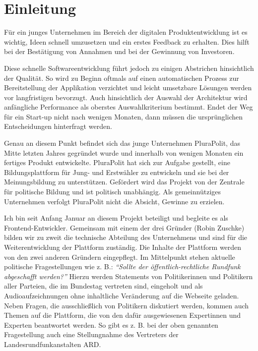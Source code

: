 \section{Einleitung}

Für ein junges Unternehmen im Bereich der digitalen Produktentwicklung ist es wichtig, Ideen schnell umzusetzen und ein erstes Feedback zu erhalten. Dies hilft bei der Bestätigung von Annahmen und bei der Gewinnung von Investoren.

Diese schnelle Softwareentwicklung führt jedoch zu einigen Abstrichen hinsichtlich der Qualität. So wird zu Beginn oftmals auf einen automatischen Prozess zur Bereitstellung der Applikation verzichtet und leicht umsetzbare Lösungen werden vor langfristigen bevorzugt. Auch hinsichtlich der Auswahl der Architektur wird anfängliche Performance als oberstes Auswahlkriterium bestimmt. Endet der Weg für ein Start-up nicht nach wenigen Monaten, dann müssen die ursprünglichen Entscheidungen hinterfragt werden.

Genau an diesem Punkt befindet sich das junge Unternehmen PluraPolit, das Mitte letzten Jahres gegründet wurde und innerhalb von wenigen Monaten ein fertiges Produkt entwickelte. PluraPolit hat sich zur Aufgabe gestellt, eine Bildungsplattform für Jung- und Erstwähler zu entwickeln und sie bei der Meinungsbildung zu unterstützen. Gefördert wird das Projekt von der Zentrale für politische Bildung und ist politisch unabhängig. Als gemeinnütziges Unternehmen verfolgt PluraPolit nicht die Absicht, Gewinne zu erzielen.

Ich bin seit Anfang Januar an diesem Projekt beteiligt und begleite es als Frontend-Entwickler. Gemeinsam mit einem der drei Gründer (Robin Zuschke) bilden wir zu zweit die technische Abteilung des Unternehmens und sind für die Weiterentwicklung der Plattform zuständig. Die Inhalte der Plattform werden von den zwei anderen Gründern eingepflegt. Im Mittelpunkt stehen aktuelle politische Fragestellungen wie z. B.: \textit{\enquote{Sollte der öffentlich-rechtliche Rundfunk abgeschafft werden?}} Hierzu werden Statements von Politikerinnen und Politikern aller Parteien, die im Bundestag vertreten sind, eingeholt und als Audioaufzeichnungen ohne inhaltliche Veränderung auf die Webseite geladen. Neben Fragen, die ausschließlich von Politikern diskutiert werden, kommen auch Themen auf die Plattform, die von den dafür ausgewiesenen Expertinnen und Experten beantwortet werden. So gibt es z. B. bei der oben genannten Fragestellung auch eine Stellungnahme des Vertreters der Landesrundfunkanstalten ARD. 

